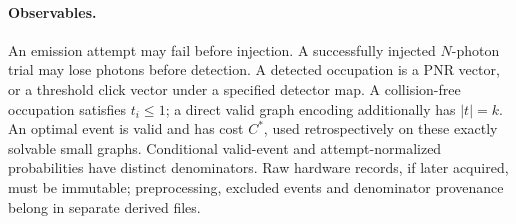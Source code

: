 \paragraph{Observables.}
An emission attempt may fail before injection. A successfully injected $N$-photon trial may lose photons before detection. A detected occupation is a PNR vector, or a threshold click vector under a specified detector map. A collision-free occupation satisfies $t_i\le1$; a direct valid graph encoding additionally has $|t|=k$. An optimal event is valid and has cost $C^*$, used retrospectively on these exactly solvable small graphs. Conditional valid-event and attempt-normalized probabilities have distinct denominators. Raw hardware records, if later acquired, must be immutable; preprocessing, excluded events and denominator provenance belong in separate derived files.
